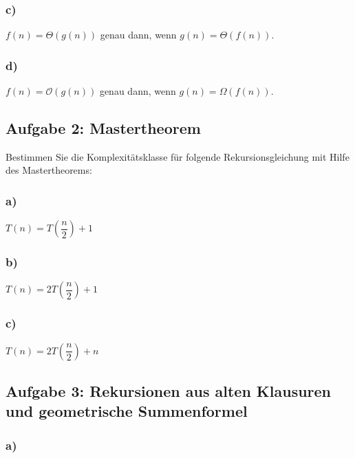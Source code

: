 \documentclass[paper=a4, fontsize=11pt]{scrartcl}
\numberwithin{equation}{section}
\numberwithin{figure}{section}
\numberwithin{table}{section}
\begin{document}
\subsubsection*{c)}

$f(n) = \Theta (g(n))$ genau dann, wenn $g(n) = \Theta (f(n))$. \\

\subsubsection*{d)}

$f(n) = \mathcal{O} (g(n))$ genau dann, wenn $g(n) = \Omega (f(n))$. \\


\subsection*{Aufgabe 2: Mastertheorem}

Bestimmen Sie die Komplexitätsklasse für folgende Rekursionsgleichung mit Hilfe des Mastertheorems:

\subsubsection*{a)}

$T(n) = T( \dfrac{n}{2}) + 1$

\subsubsection*{b)}

$T(n) = 2T( \dfrac{n}{2}) + 1$

\subsubsection*{c)}

$T(n) = 2T( \dfrac{n}{2}) + n$


\subsection*{Aufgabe 3: Rekursionen aus alten Klausuren und geometrische Summenformel}

\subsubsection*{a)}
\end{document}
